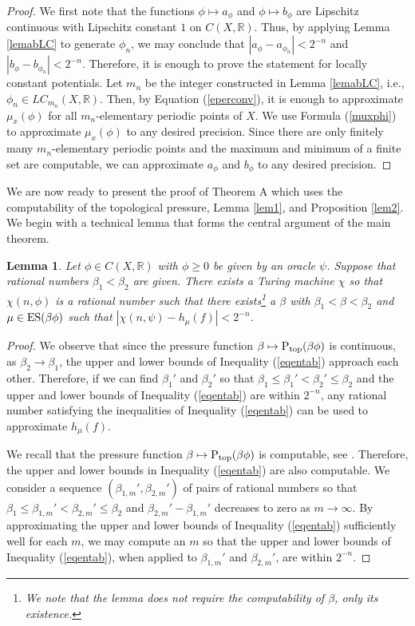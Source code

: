 \documentclass[11pt, reqno]{amsart}
\newtheorem{lemma}[theorem]{Lemma}
\renewcommand{\refeq}[1]{(\ref{#1})}
\newcommand{\bR}{{\mathbb R}}
\def\Ptop{{\rm P_{\rm top}}}
\def\ES{{\rm ES}}
\begin{document}
\begin{proof}
We first note that the functions $\phi\mapsto a_\phi$ and $\phi\mapsto b_\phi$ are Lipschitz continuous with Lipschitz constant $1$ on $C(X,\bR)$.  Thus, by applying Lemma \ref{lemabLC} to generate $\phi_n$, we may conclude that $|a_\phi-a_{\phi_n}|<2^{-n}$ and $|b_\phi-b_{\phi_n}|<2^{-n}$.  Therefore, it is enough to prove the statement for locally constant potentials.  Let $m_n$ be the integer constructed in Lemma \ref{lemabLC}, i.e., $\phi_n\in LC_{m_n}(X,\bR)$.  Then, by Equation \refeq{eperconv}, it is enough to approximate $\mu_x(\phi)$ for all $m_n$-elementary periodic points of $X$.  We use Formula \refeq{muxphi} to approximate $\mu_x(\phi)$ to any desired precision.  Since there are only finitely many $m_n$-elementary periodic points and the maximum and minimum of a finite set are computable, we can approximate $a_\phi$ and $b_\phi$ to any desired precision.
\end{proof}

We are now ready to present the proof of Theorem A which uses the computability of the topological pressure, Lemma \ref{lem1}, and Proposition \ref{lem2}.  We begin with a technical lemma that forms the central argument of the main theorem.

\begin{lemma}\label{lem:approxentropy}
Let $\phi\in C(X,\bR)$ with $\phi\geq 0$ be given by an oracle $\psi$.  Suppose that rational numbers $\beta_1<\beta_2$ are given.  There exists a Turing machine $\chi$ so that $\chi(n,\phi)$ is a rational number such that there exists\footnote{We note that the lemma does not require the computability of $\beta$, only its existence.} a $\beta$ with $\beta_1<\beta<\beta_2$ and $\mu\in\ES(\beta\phi)$ such that $|\chi(n,\psi)-h_\mu(f)|<2^{-n}$.
\end{lemma}

\begin{proof}
We observe that since the pressure function $\beta\mapsto\Ptop(\beta\phi)$ is continuous, as $\beta_2\rightarrow\beta_1$, the upper and lower bounds of Inequality (\ref{eqentab}) approach each other.  Therefore, if we can find $\beta_1'$ and  $\beta_2'$ so that $\beta_1\leq \beta_1'<\beta_2'\leq\beta_2$ and the upper and lower bounds of Inequality (\ref{eqentab}) are within $2^{-n}$, any rational number satisfying the inequalities of Inequality (\ref{eqentab}) can be used to approximate $h_\mu(f)$.

We recall that the pressure function $\beta\mapsto\Ptop(\beta\phi)$ is computable, see \cite{BSW,Sp}.  Therefore, the upper and lower bounds in Inequality (\ref{eqentab}) are also computable.  We consider a sequence $(\beta_{1,m}',\beta_{2,m}')$ of pairs of rational numbers so that $\beta_1\leq\beta_{1,m}'<\beta_{2,m}'\leq \beta_2$ and $\beta_{2,m}'-\beta_{1,m}'$ decreases to zero as $m\to\infty$.  By approximating the upper and lower bounds of Inequality (\ref{eqentab}) sufficiently well for each $m$, we may compute an $m$ so that the upper and lower bounds of Inequality (\ref{eqentab}), when applied to $\beta_{1,m}'$ and $\beta_{2,m}'$, are within $2^{-n}$. 
\end{proof}
\end{document}
